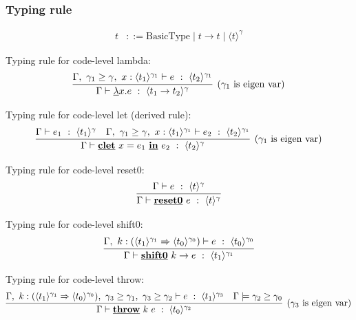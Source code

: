 \documentclass[dvipdfmx,cjk,xcolor=dvipsnames,envcountsect,notheorems,12pt]{beamer}
\newcommand\cfun[2]{\underline{\lambda}{#1}.{#2}}
\newcommand\cResetz{\underline{\textbf{reset0}}}
\newcommand\cShiftz{\underline{\textbf{shift0}}}
\newcommand\cThrow{\underline{\textbf{throw}}}
\newcommand\cresetz[1]{\cResetz~{#1}}
\newcommand\cshiftz[2]{\cShiftz~{#1}\to{#2}}
\newcommand\cthrow[2]{\cThrow~{#1}~{#2}}
\newcommand\cLet{\underline{\textbf{clet}}}
\newcommand\cIn{\underline{\textbf{in}}}
\newcommand\clet[3]{\cLet~{#1}={#2}~\cIn~{#3}}
\newcommand\codeT[2]{\langle{#1}\rangle^{#2}}
\newcommand\contT[2]{({#1} \Rightarrow {#2})}
\newcommand\ord{\ge}
\theoremstyle{definition}
\begin{document}
\begin{frame}
  \frametitle{Typing rule}
  \begin{align*}
    t & ::= \textrm{BasicType} \mid t \to t \mid \codeT{t}{\gamma}
  \end{align*}

  Typing rule for code-level lambda:
  \[
    \infer[(\gamma_1~\text{is eigen var})]
    {\Gamma \vdash \cfun{x}{e} ~:~ \codeT{t_1\to t_2}{\gamma}}
    {\Gamma,~\gamma_1 \ord \gamma,~x:\codeT{t_1}{\gamma_1} \vdash e
      ~:~ \codeT{t_2}{\gamma_1}}
  \]

  Typing rule for code-level let (derived rule):
  \[
    \infer[(\gamma_1~\text{is eigen var})]
    {\Gamma \vdash \clet{x}{e_1}{e_2} ~:~ \codeT{t_2}{\gamma}}
    {\Gamma \vdash e_1 ~:~ \codeT{t_1}{\gamma}
      &\Gamma,~\gamma_1 \ord \gamma,~x:\codeT{t_1}{\gamma_1} \vdash
      e_2 ~:~ \codeT{t_2}{\gamma_1}
    }
  \]

  Typing rule for code-level reset0:
  \[
    \infer{\Gamma \vdash \cresetz{e} ~:~ \codeT{t}{\gamma}}
    {\Gamma \vdash e ~:~ \codeT{t}{\gamma}}
  \]

  Typing rule for code-level shift0:
  \[
    \infer{\Gamma \vdash \cshiftz{k}{e} ~:~ \codeT{t_1}{\gamma_1}}
    {\Gamma,~k:\contT{\codeT{t_1}{\gamma_1}}{\codeT{t_0}{\gamma_0}}
      \vdash e ~:~ \codeT{t_0}{\gamma_0}}
  \]

  Typing rule for code-level throw:
  \[
    \infer[(\gamma_3~\text{is eigen var})]
    {\Gamma \vdash \cthrow{k}{e} ~:~ \codeT{t_0}{\gamma_2}}
    {\Gamma,~k:\contT{\codeT{t_1}{\gamma_1}}{\codeT{t_0}{\gamma_0}},~
      \gamma_3 \ord \gamma_1,~
      \gamma_3 \ord \gamma_2
      \vdash e ~:~ \codeT{t_1}{\gamma_3}
      & \Gamma \models \gamma_2 \ord \gamma_0
    }
  \]

\end{frame}
\end{document}
